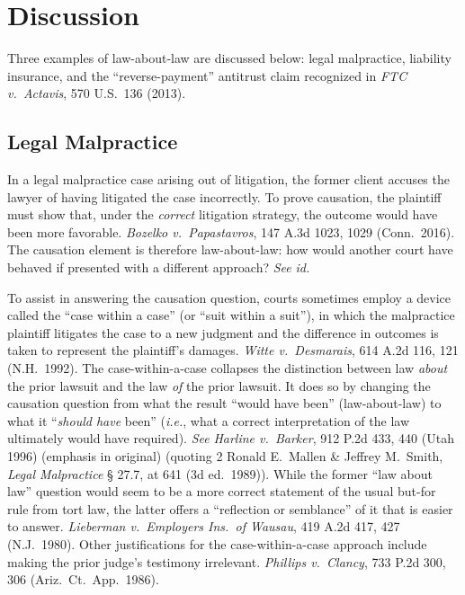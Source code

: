 \documentclass[
  12pt,
  letterpaper,
]{scrartcl}
\begin{document}
\section{Discussion}

Three examples of law-about-law are discussed below: legal malpractice,
liability insurance, and the ``reverse-payment'' antitrust claim recognized
in \textit{FTC v.~Actavis}, 570 U.S.~136 (2013).


\subsection{Legal Malpractice}

In a legal malpractice case arising out of litigation, the former client
accuses the lawyer of having litigated the case incorrectly. To prove
causation, the plaintiff must show that, under the \textit{correct} litigation strategy, the
outcome would have been more favorable. \textit{Bozelko v.~Papastavros}, 147
A.3d 1023, 1029 (Conn.~2016). The causation element is therefore law-about-law:
how would another court have behaved if presented with a different approach? \textit{See} \textit{id.}

To assist in answering the causation question, courts sometimes employ a device called the ``case within a
case'' (or ``suit within a suit''), in which the malpractice plaintiff
litigates the  case to a new judgment and the difference in outcomes is
taken to represent the plaintiff's damages. \textit{Witte v.~Desmarais}, 614
A.2d 116, 121 (N.H.~1992). The case-within-a-case collapses the distinction
between law \textit{about} the prior lawsuit and the law \textit{of} the prior
lawsuit. It does so by changing the causation question from what the result ``would have
been'' (law-about-law) to what it ``\textit{should have} been'' (\textit{i.e.}, what a correct interpretation of the law ultimately would have required). \textit{See}
\textit{Harline v.~Barker}, 912 P.2d 433, 440 (Utah 1996) (emphasis in
original) (quoting 2 Ronald E.~Mallen \& Jeffrey M.~Smith, \textit{Legal
Malpractice} § 27.7, at 641 (3d ed.~1989)). While the former ``law about law'' question would seem to be a more correct statement of the usual but-for rule
from tort law, the latter offers a ``reflection or semblance'' of it that is easier to answer. \textit{Lieberman v.~Employers Ins.~of
Wausau}, 419 A.2d 417, 427 (N.J.~1980). Other justifications for the
case-within-a-case approach include making the prior judge's testimony
irrelevant. \textit{Phillips v.~Clancy}, 733 P.2d 300, 306
(Ariz.~Ct.~App.~1986).
\end{document}
